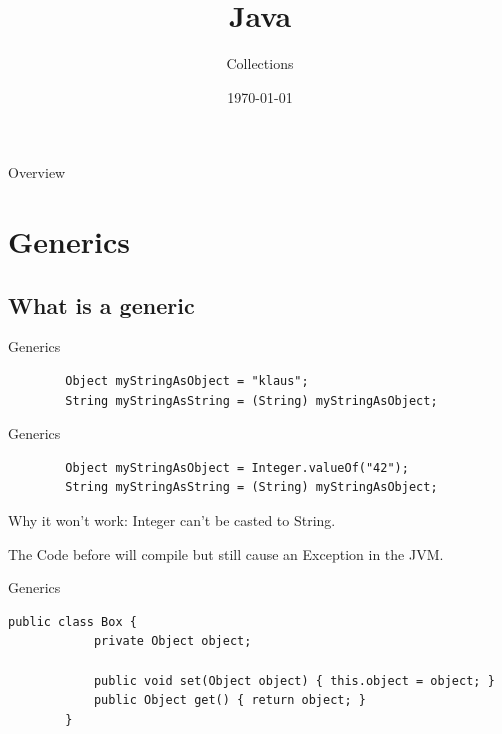 


\title{Java}
\subtitle{Collections}
\date{\today}



\begin{frame}
\titlepage
\end{frame}

\begin{frame}{Overview}
\tableofcontents
\end{frame}

\section{Generics}
\subsection{What is a generic}
\begin{frame}[fragile]{Generics}
	\begin{lstlisting}
		Object myStringAsObject = "klaus";
		String myStringAsString = (String) myStringAsObject;
	\end{lstlisting}
\end{frame}

\begin{frame}[fragile]{Generics}
	\begin{lstlisting}
		Object myStringAsObject = Integer.valueOf("42");
		String myStringAsString = (String) myStringAsObject;
	\end{lstlisting}
\end{frame}

\begin{frame}[fragile]{Why it won't work:}
		Integer can't be casted to String.
		
		The Code before will compile but still cause an Exception in the JVM.
\end{frame}

\begin{frame}[fragile]{Generics}
	\begin{lstlisting}[basicstyle=\ttfamily\scriptsize]
		public class Box {
			private Object object;

			public void set(Object object) { this.object = object; }
			public Object get() { return object; }
		}

	\end{lstlisting}
\end{frame}

